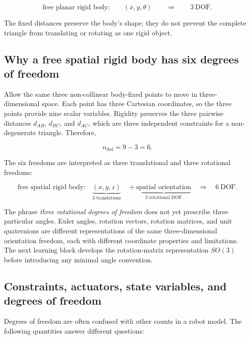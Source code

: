 \documentclass[
  australian,
  12pt,
  letterpaper,
  DIV=11,
  numbers=noendperiod,
  twoside]{scrreprt}
\begin{document}
\[
\boxed{
\text{free planar rigid body:}
\qquad
(x,y,\theta)
\qquad
\Longrightarrow
\qquad
3\ \mathrm{DOF}
}.
\]

The fixed distances preserve the body's shape; they do not prevent the
complete triangle from translating or rotating as one rigid object.

\subsection{Why a free spatial rigid body has six degrees of
freedom}\label{why-a-free-spatial-rigid-body-has-six-degrees-of-freedom}

Allow the same three non-collinear body-fixed points to move in
three-dimensional space. Each point has three Cartesian coordinates, so
the three points provide nine scalar variables. Rigidity preserves the
three pairwise distances \(d_{AB}\), \(d_{BC}\), and \(d_{AC}\), which
are three independent constraints for a non-degenerate triangle.
Therefore,

\[
n_{\mathrm{dof}}
=
9-3
=
6.
\]

The six freedoms are interpreted as three translational and three
rotational freedoms:

\[
\boxed{
\text{free spatial rigid body:}
\quad
\underbrace{(x,y,z)}_{3\text{ translations}}
\quad+
\underbrace{\text{spatial orientation}}_{3\text{ rotational DOF}}
\quad
\Longrightarrow
\quad
6\ \mathrm{DOF}
}.
\]

The phrase \emph{three rotational degrees of freedom} does not yet
prescribe three particular angles. Euler angles, rotation vectors,
rotation matrices, and unit quaternions are different representations of
the same three-dimensional orientation freedom, each with different
coordinate properties and limitations. The next learning block develops
the rotation-matrix representation \(SO(3)\) before introducing any
minimal angle convention.

\subsection{Constraints, actuators, state variables, and degrees of
freedom}\label{constraints-actuators-state-variables-and-degrees-of-freedom}

Degrees of freedom are often confused with other counts in a robot
model. The following quantities answer different questions:
\end{document}
